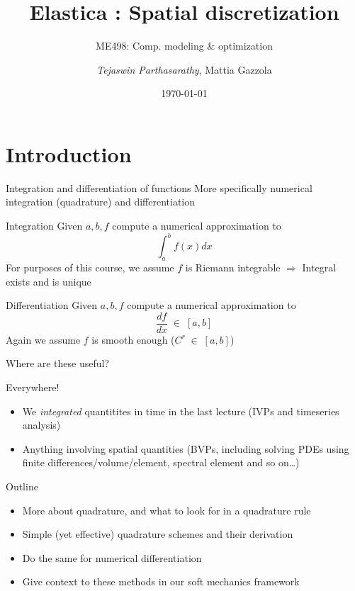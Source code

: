 \documentclass[presentation]{beamer}
\author{\emph{Tejaswin Parthasarathy}, Mattia Gazzola}
\date{\today}
\title{Elastica : Spatial discretization}
\subtitle{ME498: Comp. modeling \& optimization}
\begin{document}
\maketitle
\section{Introduction}
\label{sec:org15759a5}
\begin{frame}[label={sec:org625a4f3}]{Integration and differentiation of functions}
More specifically numerical integration (\alert{quadrature}) and differentiation
\begin{block}{Integration}
Given \(a, b, f\) compute a numerical approximation to
\[ \int_{a}^{b} f(x) dx \]
For purposes of this course, we assume \(f\) is Riemann integrable
  \(\Rightarrow\) Integral exists and is unique
\end{block}
\begin{block}{Differentiation}
Given \(a, b, f\) compute a numerical approximation to
\[ \frac{df}{dx} \; \in \; [a,b]\]
Again we assume \(f\) is smooth enough (\(C^{r}\;\in\;[a,b]\))
\end{block}
\end{frame}
\begin{frame}[label={sec:org2c049b2}]{Where are these useful?}
\begin{block}{Everywhere!}
\begin{itemize}
\item We \emph{integrated} quantitites in time in the last lecture (IVPs and
timeseries analysis)
\item Anything involving spatial quantities (BVPs, including solving PDEs using
finite differences/volume/element, spectral element and so on\ldots{})
\end{itemize}
\end{block}
\end{frame}
\begin{frame}[label={sec:orgf482f7c}]{Outline}
\begin{itemize}
\item More about quadrature, and what to look for in a quadrature rule
\item Simple (yet effective) quadrature schemes and their derivation
\item Do the same for numerical differentiation
\item Give context to these methods in our soft mechanics framework
\end{itemize}
\end{frame}
\end{document}

